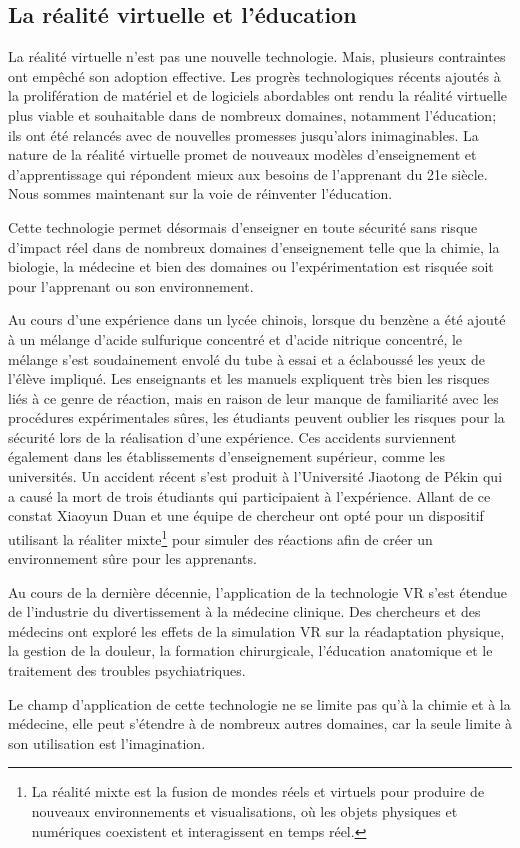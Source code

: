 \subsection{La réalité virtuelle et l'éducation}

La réalité virtuelle n'est pas une nouvelle technologie. Mais, plusieurs contraintes ont empêché son adoption effective. Les progrès technologiques récents ajoutés à la prolifération de matériel et de logiciels abordables ont rendu la réalité virtuelle plus viable et souhaitable dans de nombreux domaines, notamment l'éducation; ils ont été relancés avec de nouvelles promesses jusqu'alors inimaginables. La nature de la réalité virtuelle promet de nouveaux modèles d'enseignement et d'apprentissage qui répondent mieux aux besoins de l'apprenant du 21e siècle.
Nous sommes maintenant sur la voie de réinventer l'éducation.

Cette technologie permet désormais d'enseigner en toute sécurité sans risque d'impact réel dans de nombreux domaines d'enseignement telle que la chimie, la biologie, la médecine et bien des domaines ou l'expérimentation est risquée soit pour l'apprenant ou son environnement.

Au cours d'une expérience dans un lycée chinois, lorsque du benzène a été ajouté à un mélange d'acide sulfurique concentré et d'acide nitrique concentré, le mélange s'est soudainement envolé du tube à essai et a éclaboussé les yeux de l'élève impliqué\cite{duan2020mixed}.
Les enseignants et les manuels expliquent très bien les risques liés à ce genre de réaction, mais en raison de leur manque de familiarité avec les procédures expérimentales sûres, les étudiants peuvent oublier les risques pour la sécurité lors de la réalisation d'une expérience\cite{duan2020mixed}.
Ces accidents surviennent également dans les établissements d'enseignement supérieur, comme les universités. Un accident récent s'est produit à l'Université Jiaotong de Pékin qui a causé la mort de trois étudiants qui participaient à l'expérience.
Allant de ce constat Xiaoyun Duan\cite{duan2020mixed} et une équipe de chercheur ont opté pour un dispositif utilisant la réaliter mixte\footnote{La réalité mixte est la fusion de mondes réels et virtuels pour produire de nouveaux environnements et visualisations, où les objets physiques et numériques coexistent et interagissent en temps réel.} pour simuler des réactions afin de créer un environnement sûre pour les apprenants.

Au cours de la dernière décennie, l'application de la technologie VR s'est étendue de l'industrie du divertissement à la médecine clinique. Des chercheurs et des médecins ont exploré les effets de la simulation VR sur la réadaptation physique, la gestion de la douleur, la formation chirurgicale, l'éducation anatomique et le traitement des troubles psychiatriques\cite{li2011virtual, baldominos2015approach, malloy2010effectiveness, alaker2016virtual, yiannakopoulou2015virtual, hackett2016three}.

Le champ d'application de cette technologie ne se limite pas qu'à la chimie et à la médecine, elle peut s'étendre à de nombreux autres domaines, car la seule limite à son utilisation est l'imagination.